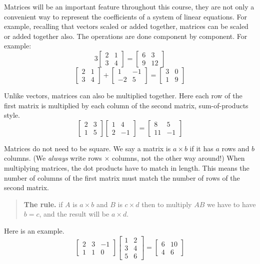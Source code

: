 \documentclass[11pt,oneside]{amsbook}
\theoremstyle{definition}
\theoremstyle{plain}
\theoremstyle{definition}
\theoremstyle{remark}
\numberwithin{equation}{section}
\numberwithin{figure}{section}
\begin{document}
Matrices will be an important feature throughout this course, they are not only a convenient way to represent the coefficients of a system of linear equations. For example, recalling that vectors scaled or added together, matrices can be scaled or added together also. The operations are done component by component. For example:
\[3\begin{bmatrix}2&1\\3&4\end{bmatrix}
  =\begin{bmatrix}6&3\\9&12\end{bmatrix}
\]
\[\begin{bmatrix}2&1\\3&4\end{bmatrix}
  +\begin{bmatrix}1&-1\\-2&5\end{bmatrix}
  =\begin{bmatrix}3&0\\1&9\end{bmatrix}
\]

Unlike vectors, matrices can also be multiplied together. Here each row of the first matrix is multiplied by each column of the second matrix, sum-of-products style.
\[\begin{bmatrix}2&3\\1&5\end{bmatrix}
  \begin{bmatrix}1&4\\2&-1\end{bmatrix}
  =\begin{bmatrix}8&5\\11&-1\end{bmatrix}
\]

Matrices do not need to be square. We say a matrix is $a\times b$ if it has $a$ rows and $b$ columns. (We \emph{always} write rows $\times$ columns, not the other way around!) When multiplying matrices, the dot products have to match in length. This means the number of columns of the first matrix must match the number of rows of the second matrix.
\begin{quotation}
  \textbf{The rule.} if $A$ is $a\times b$ and $B$ is $c\times d$ then to multiply $AB$ we have to have $b=c$, and the result will be $a\times d$.
\end{quotation}
Here is an example.
\[\begin{bmatrix}2&3&-1\\1&1&0\end{bmatrix}
  \begin{bmatrix}1&2\\3&4\\5&6\end{bmatrix}
  =\begin{bmatrix}6&10\\4&6\end{bmatrix}
\]
\end{document}
